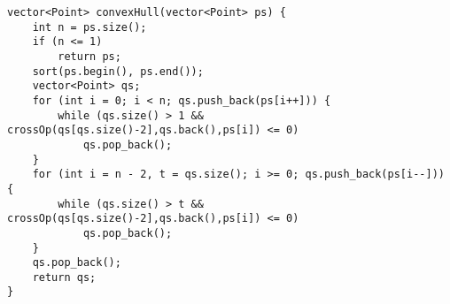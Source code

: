 \begin{lstlisting} 
vector<Point> convexHull(vector<Point> ps) {
	int n = ps.size();
	if (n <= 1)
		return ps;
	sort(ps.begin(), ps.end());
	vector<Point> qs;
	for (int i = 0; i < n; qs.push_back(ps[i++])) {
		while (qs.size() > 1 && crossOp(qs[qs.size()-2],qs.back(),ps[i]) <= 0)
			qs.pop_back();
	}
	for (int i = n - 2, t = qs.size(); i >= 0; qs.push_back(ps[i--])) {
		while (qs.size() > t && crossOp(qs[qs.size()-2],qs.back(),ps[i]) <= 0)
			qs.pop_back();
	}
	qs.pop_back();
	return qs;
}
\end{lstlisting} 
